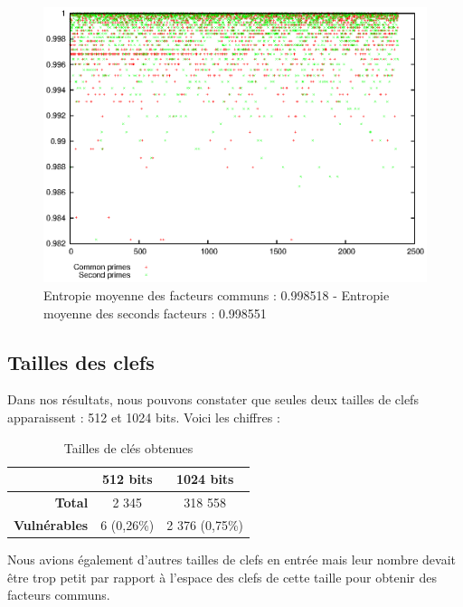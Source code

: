 \begin{figure}[H]
\centering
\includegraphics[width=16cm]{images/entropyprimes.eps}
\caption[Entropie moyenne]{Entropie moyenne des facteurs communs : 0.998518 - Entropie moyenne des seconds facteurs : 0.998551}
\label{entropiePrime}
\end{figure}


\subsection{Tailles des clefs}
Dans nos résultats, nous pouvons constater que seules deux tailles de clefs apparaissent : 512 et 1024 bits. Voici les chiffres :


\begin{table}[H]
\centering
\begin{tabular}{|r|c|c|}
\hline
\textbf{}&\textbf{512 bits}&\textbf{1024 bits}\\
\hline
\textbf{Total}&2 345&318 558\\
\hline
\textbf{Vulnérables}&6 (0,26\%)&2 376 (0,75\%)\\
\hline
\end{tabular}
\caption{Tailles de clés obtenues}
\label{tailles}
\end{table}


Nous avions également d'autres tailles de clefs en entrée mais leur nombre devait être trop petit par rapport à l'espace des clefs de cette taille pour obtenir des facteurs communs.



